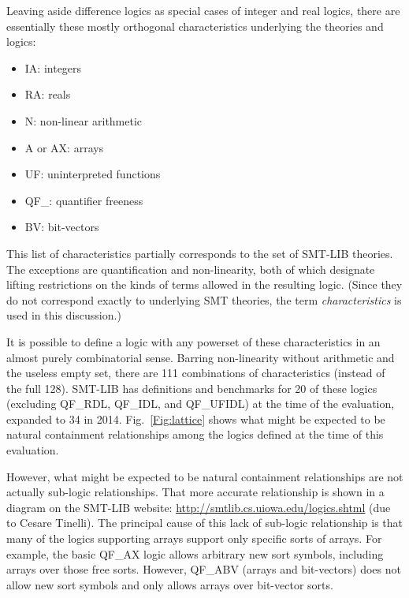 \documentclass[smallcondensed]{svjour3}
\begin{document}
Leaving aside difference logics as special cases of integer and real logics, there are essentially these mostly orthogonal characteristics underlying the theories and logics:
\begin{itemize}[noitemsep,nolistsep] %
\item IA: integers 
\item RA: reals
\item N: non-linear arithmetic
\item A or AX: arrays
\item UF: uninterpreted functions
\item QF\_: quantifier freeness
\item BV: bit-vectors
\end{itemize}
This list of characteristics partially corresponds to the set of SMT-LIB theories. The exceptions are quantification and non-linearity, both of which designate lifting restrictions on the kinds of terms allowed in the resulting logic. (Since they do not correspond exactly to underlying SMT theories, the term {\em characteristics} is used in this discussion.)

It is possible to define a logic with any powerset of these characteristics in an almost purely combinatorial sense. 
Barring non-linearity without arithmetic and the useless empty set, there are 111 combinations of characteristics (instead of the full 128). SMT-LIB has definitions and benchmarks for 20 of these logics (excluding QF\_RDL, QF\_IDL, and QF\_UFIDL) at the time of the evaluation, expanded to 34 in 2014. Fig.~\ref{Fig:lattice} shows what might be expected to be natural containment relationships among the logics defined at the time of this evaluation. 

However, what might be expected to be natural containment relationships are not actually sub-logic relationships. That more accurate relationship is shown in a diagram on the SMT-LIB website: \url{http://smtlib.cs.uiowa.edu/logics.shtml} (due to Cesare Tinelli). The principal cause of this lack of sub-logic relationship is that many of the logics supporting arrays support only specific sorts of arrays. For example, the basic QF\_AX logic allows arbitrary new sort symbols, including arrays over those free sorts. However, QF\_ABV (arrays and bit-vectors) does not allow new sort symbols and only allows arrays over bit-vector sorts.
\end{document}

